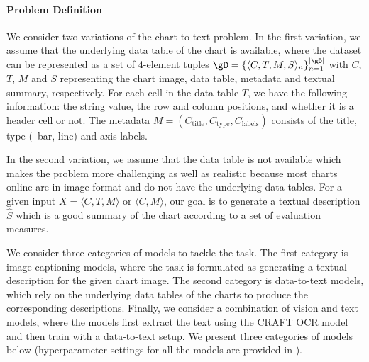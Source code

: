 

\paragraph{Problem Definition}

We consider two variations of the chart-to-text problem. In the first variation,  we assume that the underlying data table of the chart is available, where the dataset can be represented as a set of 4-element tuples $\gD = \{\langle C, T, M, S\rangle_n\}_{n=1}^{|\gD|}$ with $C$, $T$, $M$ and $S$ representing the chart image, data table, metadata and textual summary, respectively. For each cell in the data table $T$, we have the following information: \Ni the string value, \Nii the row and column positions, and \Niii whether it is a header cell or not. The metadata $M = (C_{\text{title}}, C_{\text{type}}, C_{\text{labels}})$ consists of the title, type (\eg\ bar, line) and axis labels. 

In the  second variation, we assume that the data table is not available which makes the problem more challenging as well as realistic because most charts online are in image format and do not have the underlying data tables. For a given input $X=\langle C,T,M \rangle$ or $\langle C,M \rangle$, our goal is to generate a textual description $\hat{S}$ which is a good summary of the chart according to a set of evaluation measures.  



We consider three categories of models to tackle the task. The first category is image captioning models, where the task is formulated as generating a textual description for the given chart image. The second category is data-to-text models, which rely on the underlying data tables of the charts to produce the corresponding descriptions. Finally, we consider a combination of vision and text models, where the models first extract the 
text 
using the CRAFT OCR model \cite{craftdetection} and then train with a data-to-text setup. 
We present three categories of models below (hyperparameter settings for all the models are provided
in ).



